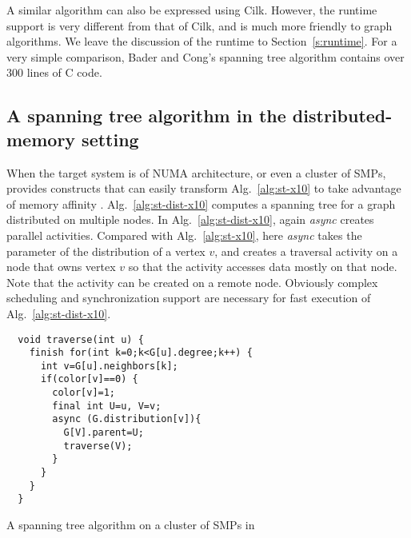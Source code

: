 A similar algorithm can also be expressed using Cilk. However, the \Xten{} runtime support is very different from that of Cilk, and is much more friendly to graph algorithms. We leave the discussion of the \Xten{} runtime to Section~\ref{s:runtime}. For a very simple comparison, Bader and Cong's spanning tree algorithm contains over 300 lines of C code.


\subsection{A spanning tree algorithm in the distributed-memory setting}
\label{s:trav-dist}

 When the target system is of NUMA architecture, or even a cluster of SMPs, \Xten{} provides constructs that can easily transform Alg.~\ref{alg:st-x10} to take advantage of memory affinity . Alg.~\ref{alg:st-dist-x10} computes a spanning tree for a graph distributed on multiple nodes. In Alg.~\ref{alg:st-dist-x10}, again \emph{async} creates parallel activities. Compared with Alg.~\ref{alg:st-x10}, here \emph{async} takes the parameter of the distribution of a vertex $v$, and creates a traversal activity on a node that owns vertex $v$ so that the activity accesses data mostly on that node. Note that the activity can be created on a remote node. Obviously complex scheduling and synchronization support are necessary for fast execution of Alg.~\ref{alg:st-dist-x10}.

\begin{algorithm}
\centering
\scriptsize
\begin{minipage}{0.5\textwidth}
\begin{verbatim} 
  void traverse(int u) {
    finish for(int k=0;k<G[u].degree;k++) {
      int v=G[u].neighbors[k];
      if(color[v]==0) {
        color[v]=1;
        final int U=u, V=v;
        async (G.distribution[v]){
          G[V].parent=U;
          traverse(V);
        }
      }
    }
  }
\end{verbatim}
\end{minipage}
\caption{A spanning tree algorithm on a cluster of SMPs in \Xten{}}
\label{alg:st-dist-x10}
\end{algorithm}



